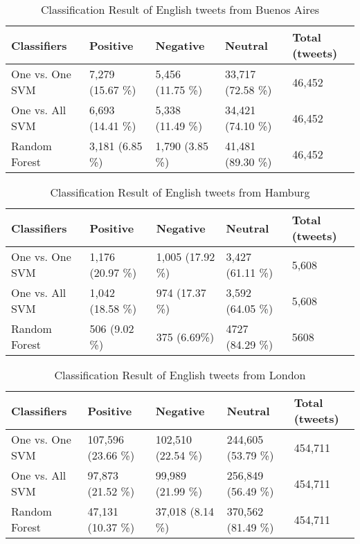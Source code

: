 \begin{table}[ht]
	\caption{Classification Result of English tweets from Buenos Aires}
	\begin{tabular}{|l|p{1.8cm}|p{1.8cm}|p{1.8cm}|p{1.8cm}|} \hline
	Classifiers & Positive & Negative & Neutral & Total (tweets)\\ \hline
One vs. One SVM & 7,279 (15.67 \%) & 5,456 (11.75 \%) & 33,717 (72.58 \%) & 46,452 \\ \hline
One vs. All SVM & 6,693 (14.41 \%) & 5,338 (11.49 \%) & 34,421 (74.10 \%) & 46,452 \\\hline
Random Forest   & 3,181 (6.85 \%) & 1,790 (3.85 \%) & 41,481 (89.30 \%) & 46,452 \\\hline
	\end{tabular}
	\label{tab:result_buenosaires_en}
\end{table}



\begin{table}[ht]
	\caption{Classification Result of English tweets from Hamburg}
	\begin{tabular}{|l|p{1.8cm}|p{1.8cm}|p{1.8cm}|p{1.8cm}|} \hline
	Classifiers & Positive & Negative & Neutral & Total (tweets)\\ \hline
One vs. One SVM & 1,176 (20.97 \%) & 1,005 (17.92 \%) & 3,427 (61.11 \%) & 5,608 \\\hline
One vs. All SVM & 1,042 (18.58 \%) & 974 (17.37 \%) & 3,592 (64.05 \%) & 5,608 \\\hline
Random Forest   & 506 (9.02 \%)  & 375 (6.69\%) & 4727 (84.29 \%) & 5608 \\\hline
	\end{tabular}
	\label{tab:result_hamburg_en}
\end{table}

\begin{table}[ht]
	\caption{Classification Result of English tweets from London}
	\begin{tabular}{|l|p{1.8cm}|p{1.8cm}|p{1.8cm}|p{1.8cm}|} \hline
	Classifiers & Positive & Negative & Neutral & Total (tweets)\\ \hline
One vs. One SVM & 107,596 (23.66 \%) & 102,510 (22.54 \%) & 244,605 (53.79 \%)& 454,711 \\ \hline
One vs. All SVM & 97,873 (21.52 \%) & 99,989 (21.99 \%) & 256,849 (56.49 \%)& 454,711 \\ \hline
Random Forest   & 47,131 (10.37 \%)  & 37,018 (8.14 \%)  & 370,562 (81.49 \%) & 454,711 \\ \hline
	\end{tabular}
	\label{tab:result_london_en}
\end{table}

